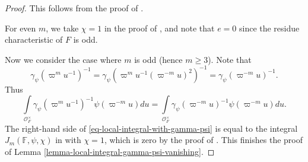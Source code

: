 \documentclass[11pt]{amsart}
\theoremstyle{definition}
\theoremstyle{remark}
\begin{document}
\begin{proof}
This follows from the proof of \cite[Lemma 1.11]{Szpruch2009}. 

For even $m$, we take $\chi=1$ in the proof of \cite[Lemma 1.11]{Szpruch2009}, and note that $e=0$ since the residue characteristic of $F$ is odd. 

Now we consider the case where $m$ is odd (hence $m\ge 3$). 
Note that
\begin{equation*}
    \gamma_\psi( \varpi^{m} u^{-1})^{-1} = \gamma_\psi( \varpi^{m} u^{-1} (\varpi^{-m} u)^2 )^{-1} =\gamma_\psi( \varpi^{-m} u)^{-1}.
\end{equation*}
Thus
\begin{equation}
\label{eq-local-integral-with-gamma-psi}
\int\limits_{\mathcal{O}_F^\times} \gamma_\psi( \varpi^{m} u^{-1})^{-1}  \psi( \varpi^{-m} u)du=\int\limits_{\mathcal{O}_F^\times} \gamma_\psi( \varpi^{-m} u )^{-1}  \psi( \varpi^{-m} u)du.
\end{equation}
The right-hand side of \eqref{eq-local-integral-with-gamma-psi} is equal to the integral $J_m(\mathbb{F}, \psi, \chi)$ in \cite{Szpruch2009} with $\chi=1$, which is zero by the proof of \cite[Lemma 1.11]{Szpruch2009}. This finishes the proof of Lemma \ref{lemma-local-integral-gamma-psi-vanishing}.
\end{proof}
\end{document}
